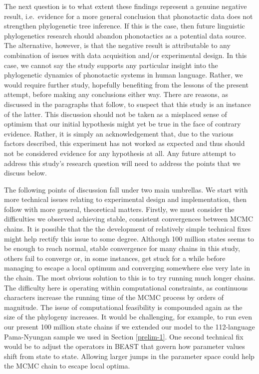 \documentclass[]{article}
\begin{document}
The next question is to what extent these findings represent a genuine negative result, i.e.~evidence for a more general conclusion that phonotactic data does not strengthen phylogenetic tree inference. If this is the case, then future linguistic phylogenetics research should abandon phonotactics as a potential data source. The alternative, however, is that the negative result is attributable to any combination of issues with data acquisition and/or experimental design. In this case, we cannot say the study supports any particular insight into the phylogenetic dynamics of phonotactic systems in human language. Rather, we would require further study, hopefully benefiting from the lessons of the present attempt, before making any conclusions either way. There are reasons, as discussed in the paragraphs that follow, to suspect that this study is an instance of the latter. This discussion should not be taken as a misplaced sense of optimism that our initial hypothesis might yet be true in the face of contrary evidence. Rather, it is simply an acknowledgement that, due to the various factors described, this experiment has not worked as expected and thus should not be considered evidence for any hypothesis at all. Any future attempt to address this study's research question will need to address the points that we discuss below.

The following points of discussion fall under two main umbrellas. We start with more technical issues relating to experimental design and implementation, then follow with more general, theoretical matters. Firstly, we must consider the difficulties we observed achieving stable, consistent convergences between MCMC chains. It is possible that the the development of relatively simple technical fixes might help rectify this issue to some degree. Although 100 million states seems to be enough to reach normal, stable convergence for many chains in this study, others fail to converge or, in some instances, get stuck for a while before managing to escape a local optimum and converging somewhere else very late in the chain. The most obvious solution to this is to try running much longer chains. The difficulty here is operating within computational constraints, as continuous characters increase the running time of the MCMC process by orders of magnitude. The issue of computational feasibility is compounded again as the size of the phylogeny increases. It would be challenging, for example, to run even our present 100 million state chains if we extended our model to the 112-language Pama-Nyungan sample we used in Section \ref{prelim-1}. One second technical fix would be to adjust the operators in BEAST that govern how parameter values shift from state to state. Allowing larger jumps in the parameter space could help the MCMC chain to escape local optima.
\end{document}
